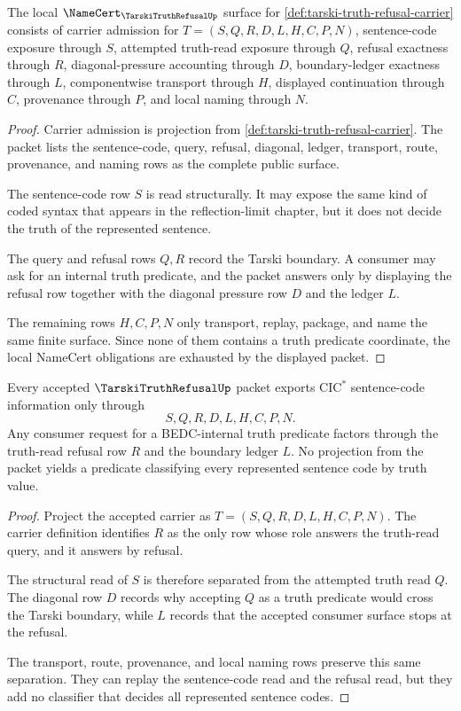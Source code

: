 \begin{theorem}
\label{thm:tarski-truth-refusal-namecert-obligations}
The local $\NameCert_{\TarskiTruthRefusalUp}$ surface for \autoref{def:tarski-truth-refusal-carrier} consists of carrier admission for $T=(S,Q,R,D,L,H,C,P,N)$, sentence-code exposure through $S$, attempted truth-read exposure through $Q$, refusal exactness through $R$, diagonal-pressure accounting through $D$, boundary-ledger exactness through $L$, componentwise transport through $H$, displayed continuation through $C$, provenance through $P$, and local naming through $N$.
\end{theorem}
\begin{proof}
Carrier admission is projection from \autoref{def:tarski-truth-refusal-carrier}. The packet lists the sentence-code, query, refusal, diagonal, ledger, transport, route, provenance, and naming rows as the complete public surface.

The sentence-code row $S$ is read structurally. It may expose the same kind of coded syntax that appears in the reflection-limit chapter, but it does not decide the truth of the represented sentence.

The query and refusal rows $Q,R$ record the Tarski boundary. A consumer may ask for an internal truth predicate, and the packet answers only by displaying the refusal row together with the diagonal pressure row $D$ and the ledger $L$.

The remaining rows $H,C,P,N$ only transport, replay, package, and name the same finite surface. Since none of them contains a truth predicate coordinate, the local NameCert obligations are exhausted by the displayed packet.
\end{proof}

\begin{theorem}
\label{thm:tarski-truth-refusal-nonescape}
Every accepted $\TarskiTruthRefusalUp$ packet exports $\mathrm{CIC}^{*}$ sentence-code information only through
$$
S,Q,R,D,L,H,C,P,N.
$$
Any consumer request for a BEDC-internal truth predicate factors through the truth-read refusal row $R$ and the boundary ledger $L$. No projection from the packet yields a predicate classifying every represented sentence code by truth value.
\end{theorem}
\begin{proof}
Project the accepted carrier as $T=(S,Q,R,D,L,H,C,P,N)$. The carrier definition identifies $R$ as the only row whose role answers the truth-read query, and it answers by refusal.

The structural read of $S$ is therefore separated from the attempted truth read $Q$. The diagonal row $D$ records why accepting $Q$ as a truth predicate would cross the Tarski boundary, while $L$ records that the accepted consumer surface stops at the refusal.

The transport, route, provenance, and local naming rows preserve this same separation. They can replay the sentence-code read and the refusal read, but they add no classifier that decides all represented sentence codes.
\end{proof}


